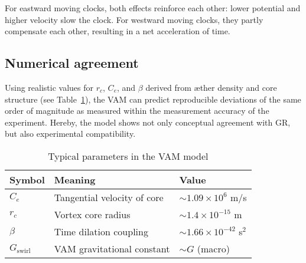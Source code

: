 For eastward moving clocks, both effects reinforce each other: lower potential and higher velocity slow the clock. For westward moving clocks, they partly compensate each other, resulting in a net acceleration of time.
\subsection{Numerical agreement}

Using realistic values for $r_c$, $C_e$, and $\beta$ derived from æther density and core structure (see Table~\ref{tab:constants}), the VAM can predict reproducible deviations of the same order of magnitude as measured within the measurement accuracy of the experiment. Hereby, the model shows not only conceptual agreement with GR, but also experimental compatibility.

\begin{table}[h!]
    \centering
    \caption{Typical parameters in the VAM model}
    \label{tab:constants}
    \begin{tabular}{lll}
        \toprule
        Symbol & Meaning & Value \\
        \midrule
        $C_e$ & Tangential velocity of core & $\sim 1.09 \times 10^6$ m/s \\
        $r_c$ & Vortex core radius & $\sim 1.4 \times 10^{-15}$ m \\
        $\beta$ & Time dilation coupling & $\sim 1.66 \times 10^{-42}$ s$^2$ \\
        $G_\text{swirl}$ & VAM gravitational constant & $\sim G$ (macro) \\
        \bottomrule
    \end{tabular}
\end{table}
